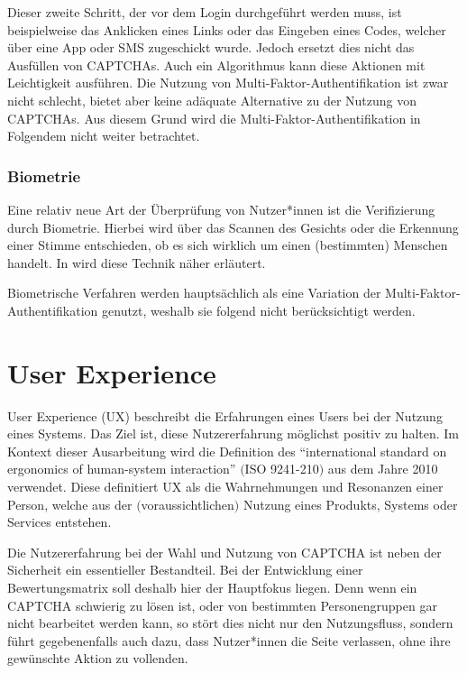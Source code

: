 Dieser zweite Schritt, der vor dem Login durchgeführt werden muss, ist beispielweise das Anklicken eines Links oder das Eingeben eines Codes,
welcher über eine App oder SMS zugeschickt wurde.
Jedoch ersetzt dies nicht das Ausfüllen von CAPTCHAs.
Auch ein Algorithmus kann diese Aktionen mit Leichtigkeit ausführen. 
Die Nutzung von Multi-Faktor-Authentifikation ist zwar nicht schlecht,
bietet aber keine adäquate Alternative zu der Nutzung von CAPTCHAs. 
Aus diesem Grund wird die Multi-Faktor-Authentifi\-kation in Folgendem nicht weiter betrachtet.

\subsubsection*{Biometrie}
Eine relativ neue Art der Überprüfung von Nutzer*innen ist die Verifizierung durch Biometrie.
Hierbei wird über das Scannen des Gesichts oder die Erkennung einer Stimme entschieden, ob es sich wirklich um einen (bestimmten) Menschen handelt.
In \cite{rtcaptcha} wird diese Technik näher erläutert. 

Biometrische Verfahren werden hauptsächlich als eine Variation der Multi-Faktor-Authentifikation genutzt,
weshalb sie folgend nicht berücksichtigt werden. 

\section{User Experience}

User Experience (UX) beschreibt die Erfahrungen eines Users bei der Nutzung eines Systems. 
Das Ziel ist, diese Nutzererfahrung möglichst positiv zu halten. 
Im Kontext dieser Ausarbeitung wird die Definition des  ``international standard on ergonomics of human-system interaction'' $($ISO 9241-210$)$
aus dem Jahre 2010 verwendet. 
Diese definitiert UX als die Wahrnehmungen und Resonanzen einer Person, 
welche aus der $($voraussichtlichen$)$ Nutzung eines Produkts, Systems oder Services entstehen. \cite[p.1629]{berni_borgianni_2021}

Die Nutzererfahrung bei der Wahl und Nutzung von CAPTCHA ist neben der Sicherheit ein essentieller Bestandteil.
Bei der Entwicklung einer Bewertungsmatrix soll deshalb hier der Hauptfokus liegen.
Denn wenn ein CAPTCHA schwierig zu lösen ist, oder von bestimmten Personengruppen gar nicht bearbeitet werden kann, so stört dies nicht nur den Nutzungsfluss,
sondern führt gegebenenfalls auch dazu, dass Nutzer*innen die Seite verlassen, ohne ihre gewünschte Aktion zu vollenden. 

